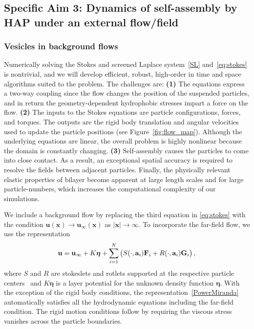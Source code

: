 \subsection{Specific Aim 3: Dynamics of self-assembly by HAP under an external flow/field}
\label{subsec:specific_aim_3}

\subsubsection{Vesicles in background flows}
Numerically solving the Stokes and screened Laplace system~\eqref{SL}
and~\eqref{eq:stokes} is nontrivial, and we will develop efficient,
robust, high-order in time and space algorithms suited to the problem.
The challenges are: {\bf (1)} The equations express a two-way coupling
since the flow changes the position of the suspended particles,
and in return the geometry-dependent hydrophobic stresses impart a force
on the flow. {\bf (2)} The inputs to the Stokes equations are particle
configurations, forces, and torques. The outputs are the rigid body
translation and angular velocities used to update the particle positions
(see Figure~\ref{fig:flow_map}). Although the underlying equations are
linear, the overall problem is highly nonlinear because the domain is
constantly changing. {\bf (3)} Self-assembly causes the particles to
come into close contact. As a result, an exceptional spatial accuracy is
required to resolve the fields between adjacent particles. Finally, the
physically relevant elastic properties of bilayer become apparent at
large length scales and for large particle-numbers, which increases the
computational complexity of our simulations. 

We include a background flow by replacing the third equation in
\eqref{eq:stokes} with the condition $\mathbf{u}(\mathbf{x})
\to \mathbf{u}_{\infty}(\mathbf{x})$ as $|\mathbf{x}| \to
\infty$. To incorporate the far-field flow, we use the representation 
\begin{align}
\label{PowerMiranda}
  {\bf u} = {\bf u}_{\infty} + K\boldsymbol{\eta} + 
    \sum_{i=1}^N \left(S(\cdot, {\bf a}_i) {\bf F}_i + 
                 R(\cdot, {\bf a}_i) {\bf G}_i\right),
\end{align}
where $S$ and $R$ are stokeslets and rotlets supported at the respective
particle centers~\cite{leal_2007} and $K\boldsymbol{\eta}$ is a layer
potential for the unknown density function $\boldsymbol{\eta}$. With the
exception of the rigid body conditions, the
representation~\eqref{PowerMiranda} automatically satisfies all the
hydrodynamic equations including the far-field condition. The rigid
motion conditions follow by requiring the viscous stress vanishes across
the particle boundaries.

